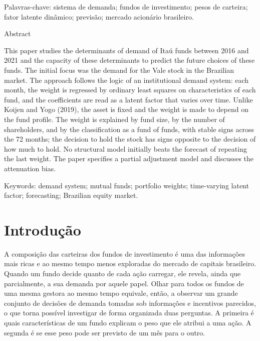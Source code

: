 \documentclass[12pt,a4paper]{article}
\begin{document}
\smallskip
\noindent Palavras-chave: sistema de demanda; fundos de investimento; pesos de carteira;
fator latente dinâmico; previsão; mercado acionário brasileiro.

\bigskip
\begin{center}{\large Abstract}\end{center}
\noindent
This paper studies the determinants of demand of Itaú funds between 2016 and 2021 and the
capacity of these determinants to predict the future choices of these funds. The initial focus
was the demand for the Vale stock in the Brazilian market. The approach follows the logic of
an institutional demand system: each month, the weight is regressed by ordinary least squares
on characteristics of each fund, and the coefficients are read as a latent factor that varies
over time. Unlike Koijen and Yogo (2019), the asset is fixed and the weight is made to depend
on the fund profile. The weight is explained by fund size, by the number of shareholders, and
by the classification as a fund of funds, with stable signs across the 72 months; the decision
to hold the stock has signs opposite to the decision of how much to hold. No structural model
initially beats the forecast of repeating the last weight. The paper specifies a partial
adjustment model and discusses the attenuation bias.

\smallskip
\noindent Keywords: demand system; mutual funds; portfolio weights; time-varying latent
factor; forecasting; Brazilian equity market.

\newpage
\thispagestyle{fancy}
\tableofcontents
\newpage

\section{Introdução}

A composição das carteiras dos fundos de investimento é uma das informações mais ricas e ao
mesmo tempo menos exploradas do mercado de capitais brasileiro. Quando um fundo decide quanto
de cada ação carregar, ele revela, ainda que parcialmente, a sua demanda por aquele papel.
Olhar para todos os fundos de uma mesma gestora ao mesmo tempo equivale, então, a observar um
grande conjunto de decisões de demanda tomadas sob informações e incentivos parecidos, o que
torna possível investigar de forma organizada duas perguntas. A primeira é quais
características de um fundo explicam o peso que ele atribui a uma ação. A segunda é se esse peso
pode ser previsto de um mês para o outro.
\end{document}
